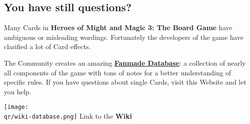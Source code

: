 \begin{multicols*}{2}
\subsection*{You have still questions?}
Many Cards in \textbf{Heroes of Might and Magic 3: The Board Game} have ambiguous or misleading wordings.
Fortunately the developers of the game have clarified a lot of Card effects.\par
\begin{minipage}{5.7cm}
    The Community creates an amazing \href{https://homm3bg.wiki/}{\textbf{Fanmade Database}}: a collection of nearly all components of the game with tons of notes for a better understanding of specific rules. If you have questions about single Cards, visit this Website and let you help.
\end{minipage}
\hfill
\begin{minipage}{2cm}
    \begin{center}
        \texttt{[image: \\qr/wiki-database.png]}
        \scriptsize Link to the \textbf{Wiki}
    \end{center}
\end{minipage}\par


\end{multicols*}
